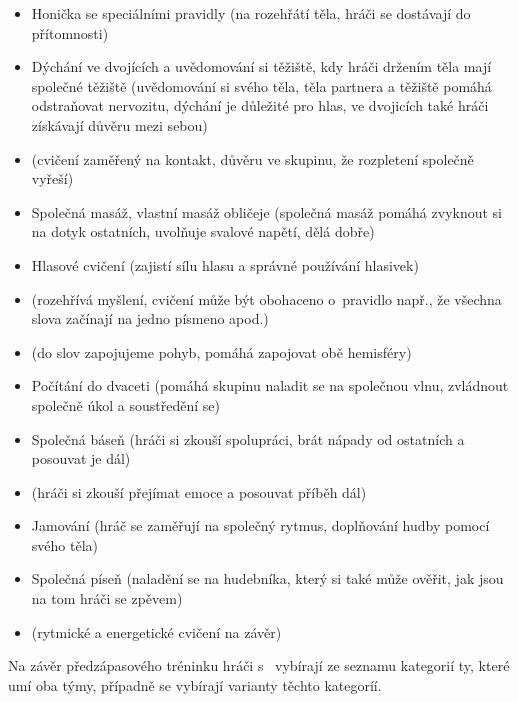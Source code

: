 \begin{itemize}
\item Honička se speciálními pravidly (na rozehřátí těla, hráči se dostávají do přítomnosti)
\item Dýchání ve dvojících a uvědomování si těžiště, kdy hráči držením těla mají společné těžiště (uvědomování si svého těla, těla partnera a těžiště pomáhá odstraňovat nervozitu, dýchání je důležité pro hlas, ve dvojicích také hráči získávají důvěru mezi sebou)
\item {} (cvičení zaměřený na kontakt, důvěru ve skupinu, že rozpletení společně vyřeší)
\item Společná masáž, vlastní masáž obličeje (společná masáž pomáhá zvyknout si na dotyk ostatních, uvolňuje svalové napětí, dělá dobře)
\item Hlasové cvičení (zajistí sílu hlasu a správné používání hlasivek)
\item {} (rozehřívá myšlení, cvičení může být obohaceno o~pravidlo např., že všechna slova začínají na jedno písmeno apod.)
\item {} (do slov zapojujeme pohyb, pomáhá zapojovat obě hemisféry)
\item Počítání do dvaceti (pomáhá skupinu naladit se na společnou vlnu, zvládnout společně úkol a soustředění se)
\item Společná báseň (hráči si zkouší spolupráci, brát nápady od ostatních a posouvat je dál)
\item {} (hráči si zkouší přejímat emoce a posouvat příběh dál)
\item Jamování (hráč se zaměřují na společný rytmus, doplňování hudby pomocí svého těla)
\item Společná píseň (naladění se na hudebníka, který si také může ověřit, jak jsou na tom hráči se zpěvem)
\item {} (rytmické a energetické cvičení na závěr)
\end{itemize}
 
Na závěr předzápasového tréninku hráči s~ vybírají ze seznamu kategorií ty, které umí oba týmy, případně se vybírají varianty těchto kategoríí. 
 
 
